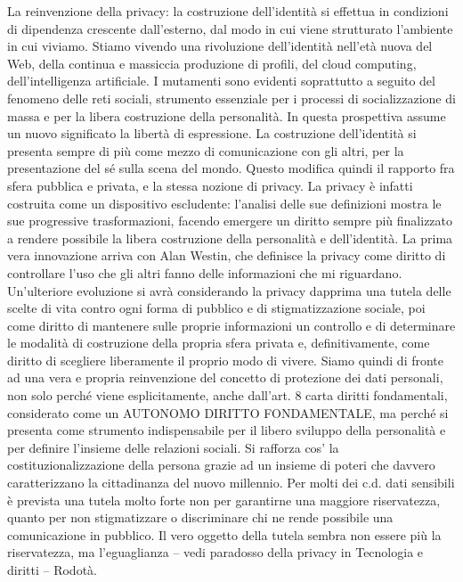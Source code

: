 La reinvenzione della privacy:
la costruzione dell’identità si effettua in condizioni di dipendenza crescente dall’esterno, dal modo in cui viene strutturato l’ambiente in cui viviamo. Stiamo vivendo una rivoluzione dell’identità nell’età nuova del Web, della continua e massiccia produzione di profili, del cloud computing, dell’intelligenza artificiale.
I mutamenti sono evidenti soprattutto a seguito del fenomeno delle reti sociali, strumento essenziale per i processi di socializzazione di massa e per la libera costruzione della personalità. In questa prospettiva assume un nuovo significato la libertà di espressione. La costruzione dell’identità si presenta sempre di più come mezzo di comunicazione con gli altri, per la presentazione del sé sulla scena del mondo. Questo modifica quindi il rapporto fra sfera pubblica e privata, e la stessa nozione di privacy.
La privacy è infatti costruita come un dispositivo escludente: l’analisi delle sue definizioni mostra le sue progressive trasformazioni, facendo emergere un diritto sempre più finalizzato a rendere possibile la libera costruzione della personalità e dell’identità.
La prima vera innovazione arriva con Alan Westin, che definisce la privacy come diritto di controllare l’uso che gli altri fanno delle informazioni che mi riguardano.
Un’ulteriore evoluzione si avrà considerando la privacy dapprima una tutela delle scelte di vita contro ogni forma di pubblico e di stigmatizzazione sociale, poi come diritto di mantenere sulle proprie informazioni un controllo e di determinare le modalità di costruzione della propria sfera privata e, definitivamente, come diritto di scegliere liberamente il proprio modo di vivere.
Siamo quindi di fronte ad una vera e propria reinvenzione del concetto di protezione dei dati personali, non solo perché viene esplicitamente, anche dall’art. 8 carta diritti fondamentali, considerato come un AUTONOMO DIRITTO FONDAMENTALE, ma perché si presenta come strumento indispensabile per il libero sviluppo della personalità e per definire l’insieme delle relazioni sociali. Si rafforza cos’ la costituzionalizzazione della persona grazie ad un insieme di poteri che davvero caratterizzano la cittadinanza del nuovo millennio.
Per molti dei c.d. dati sensibili è prevista una tutela molto forte  non per garantirne una maggiore riservatezza, quanto per non stigmatizzare o discriminare chi ne rende possibile una comunicazione in pubblico.
Il vero oggetto della tutela sembra non essere più la riservatezza, ma l’eguaglianza – vedi paradosso della privacy in Tecnologia e diritti – Rodotà.
